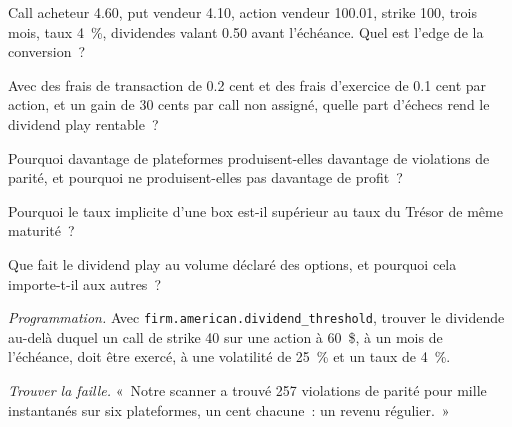 \begin{exercise}[$\star$]\label{exo:hf:options-cross-venue-and-volatility-arbitrage-at-speed:2}
Call acheteur 4.60, put vendeur 4.10, action vendeur 100.01, strike 100, trois mois, taux 4~\%, dividendes valant 0.50 avant l'échéance. Quel est l'edge de la conversion~?
\end{exercise}

\begin{exercise}[$\star$]\label{exo:hf:options-cross-venue-and-volatility-arbitrage-at-speed:3}
Avec des frais de transaction de 0.2 cent et des frais d'exercice de 0.1 cent par action, et un gain de 30 cents par call non assigné, quelle part d'échecs
rend le dividend play rentable~?
\end{exercise}

\begin{exercise}[$\star\star$]\label{exo:hf:options-cross-venue-and-volatility-arbitrage-at-speed:4}
Pourquoi davantage de plateformes produisent-elles davantage de violations de parité, et pourquoi ne produisent-elles pas davantage de profit~?
\end{exercise}

\begin{exercise}[$\star\star$]\label{exo:hf:options-cross-venue-and-volatility-arbitrage-at-speed:5}
Pourquoi le taux implicite d'une box est-il supérieur au taux du Trésor de même maturité~?
\end{exercise}

\begin{exercise}[$\star\star$]\label{exo:hf:options-cross-venue-and-volatility-arbitrage-at-speed:6}
Que fait le dividend play au volume déclaré des options, et pourquoi cela importe-t-il aux autres~?
\end{exercise}

\begin{exercise}[$\star\star\star$]\label{exo:hf:options-cross-venue-and-volatility-arbitrage-at-speed:7}
\emph{Programmation.} Avec \texttt{firm.american.dividend\_threshold}, trouver le dividende au-delà duquel un call de strike 40 sur une action à 60~\$, à un mois de l'échéance,
doit être exercé, à une volatilité de 25~\% et un taux de 4~\%.
\end{exercise}

\begin{exercise}[$\star\star\star$]\label{exo:hf:options-cross-venue-and-volatility-arbitrage-at-speed:8}
\emph{Trouver la faille.} «~Notre scanner a trouvé 257 violations de parité pour mille instantanés sur six plateformes, un cent chacune~: un revenu régulier.~»
\end{exercise}

